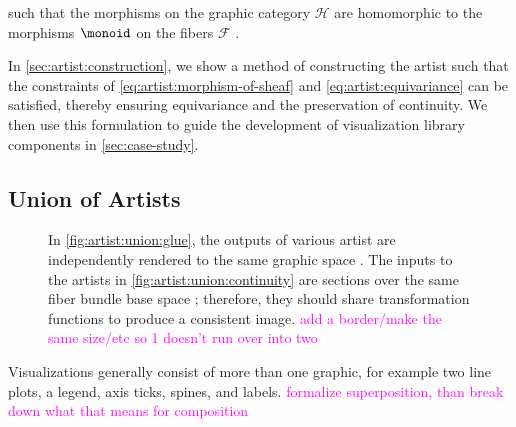 \documentclass[10pt,journal,compsoc]{IEEEtran}
\newcommand{\note}[1]{\textcolor{magenta}{#1}}
\theoremstyle{definition}
\theoremstyle{remark}
\begin{document}
such that the morphisms on the graphic category $\mathcal{H}$ are homomorphic to the morphisms $\monoid$ on the fibers $\mathcal{F}$ \cite{spanier1989algebraic,fongInvitationAppliedCategory2019}. 

In \autoref{sec:artist:construction}, we show a method of constructing the artist such that the constraints of \autoref{eq:artist:morphism-of-sheaf} and \autoref{eq:artist:equivariance} can be satisfied, thereby ensuring equivariance and the preservation of continuity. We then use this formulation to guide the development of visualization library components in \autoref{sec:case-study}.

\subsection{Union of Artists}
\label{sec:artist:union}
\begin{figure}[!h]
\centering
{}
{}
\caption{In \autoref{fig:artist:union:glue}, the outputs of various artist are independently rendered to the same graphic space \gtotal. The inputs to the artists in \autoref{fig:artist:union:continuity} are sections over the same fiber bundle base space \dbase; therefore, they should share transformation functions to produce a consistent image. \note{add a border/make the same size/etc so 1 doesn't run over into two}}
\end{figure}

Visualizations generally consist of more than one graphic, for example two line plots, a legend, axis ticks, spines, and labels. \note{formalize superposition, than break down what that means for composition}
\end{document}
